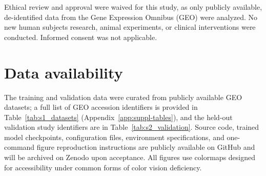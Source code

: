 \documentclass[preprint,review,12pt]{elsarticle}
\begin{document}
Ethical review and approval were waived for this study, as only publicly available, de-identified data from the Gene Expression Omnibus (GEO) were analyzed. No new human subjects research, animal experiments, or clinical interventions were conducted. Informed consent was not applicable.

\section*{Data availability}

The training and validation data were curated from publicly available GEO datasets; a full list of GEO accession identifiers is provided in Table~\ref{tab:s1_datasets} (Appendix~\ref{app:suppl-tables}), and the held-out validation study identifiers are in Table~\ref{tab:s2_validation}. Source code, trained model checkpoints, configuration files, environment specifications, and one-command figure reproduction instructions are publicly available on GitHub \citep{ref-clop-dit} and will be archived on Zenodo upon acceptance. All figures use colormaps designed for accessibility under common forms of color vision deficiency.



\end{document}
